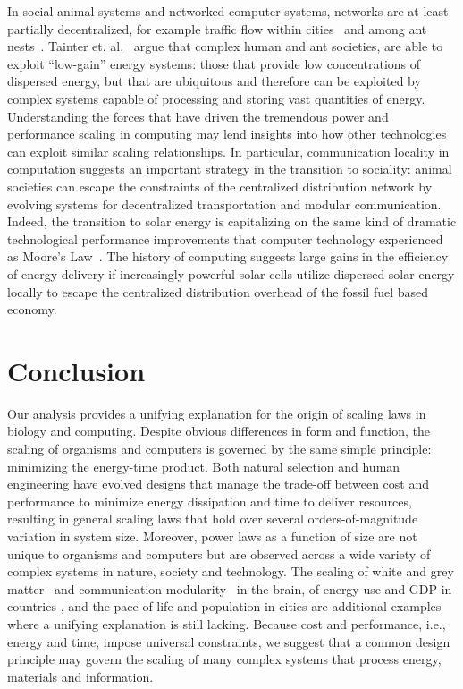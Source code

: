 \documentclass[12pt]{article}
\begin{document}
In social animal systems and networked computer systems, networks
are at least partially decentralized, for example traffic flow within cities~\cite{samaniego2008cities} and among ant nests~\cite{flanagan2013fast}. Tainter et. al.~\cite{tainter2003resource} argue that complex human and ant societies, are able to exploit ``low-gain'' energy systems: those that provide low concentrations of dispersed energy, but that are ubiquitous and therefore can be exploited by complex systems capable of processing and storing vast quantities of energy. Understanding the forces that have driven the tremendous power and performance scaling in computing may lend insights into how other technologies can exploit similar scaling relationships. In particular, communication locality in computation suggests an important strategy in the transition to sociality: animal societies can escape the constraints of the centralized distribution network
by evolving systems for decentralized transportation and modular communication. Indeed, the transition to solar energy is capitalizing on the same kind of dramatic technological performance improvements that computer technology experienced as Moore's Law~\cite{farmer2015predictable}.  The history of computing suggests large gains in the efficiency of energy delivery if increasingly powerful solar cells utilize dispersed solar energy locally to escape the centralized distribution overhead of the fossil fuel based economy.
 


\section{Conclusion}

Our analysis provides a unifying explanation for the origin of scaling laws in
biology and computing. Despite obvious differences in form and function, the
scaling of organisms and computers is governed by the same simple principle: minimizing the energy-time product. Both natural selection and human engineering have evolved designs that manage the trade-off between cost and performance to minimize energy dissipation and time to deliver resources, resulting in general scaling laws that hold over several orders-of-magnitude variation in system size. Moreover, power laws as a function of size are not
unique to organisms and computers but are observed across a wide
variety of complex systems in nature, society and technology.  The scaling of
white and grey matter~\cite{zhang00} and communication modularity~\cite{meunier2010modular} in the brain, of energy use and GDP in
countries \cite{brown11}, and the pace of life and population in cities
\cite{bettencourt07} are additional examples where a unifying explanation is
still lacking.  Because cost and performance, i.e., energy and time, impose
universal constraints, we suggest that a common design principle may govern the
scaling of many complex systems that process energy, materials and information.
\end{document}
